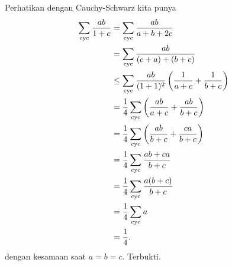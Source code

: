 
\begin{solusi}
    Perhatikan dengan Cauchy-Schwarz kita punya
    \begin{align*}
        \sum_{\mathrm{cyc}} \dfrac{ab}{1+c} &= \sum_{\mathrm{cyc}} \dfrac{ab}{a+b+2c}\\
        &= \sum_{\mathrm{cyc}} \dfrac{ab}{(c+a)+(b+c)}\\
        &\le \sum_{\mathrm{cyc}} \dfrac{ab}{(1+1)^2}\left(\dfrac{1}{a+c} + \dfrac{1}{b+c}\right)\\
        &= \dfrac{1}{4} \sum_{\mathrm{cyc}} \left(\dfrac{ab}{a+c} + \dfrac{ab}{b+c}\right)\\
        &= \dfrac{1}{4}\sum_{\mathrm{cyc}} \left(\dfrac{ab}{b+c}+\dfrac{ca}{b+c}\right)\\
        &= \dfrac{1}{4}\sum_{\mathrm{cyc}} \dfrac{ab+ca}{b+c}\\
        &= \dfrac{1}{4}\sum_{\mathrm{cyc}} \dfrac{a(b+c)}{b+c}\\
        &= \dfrac{1}{4}\sum_{\mathrm{cyc}} a\\
        &= \dfrac{1}{4}.
    \end{align*}
    dengan kesamaan saat $a=b=c$. Terbukti.
\end{solusi}